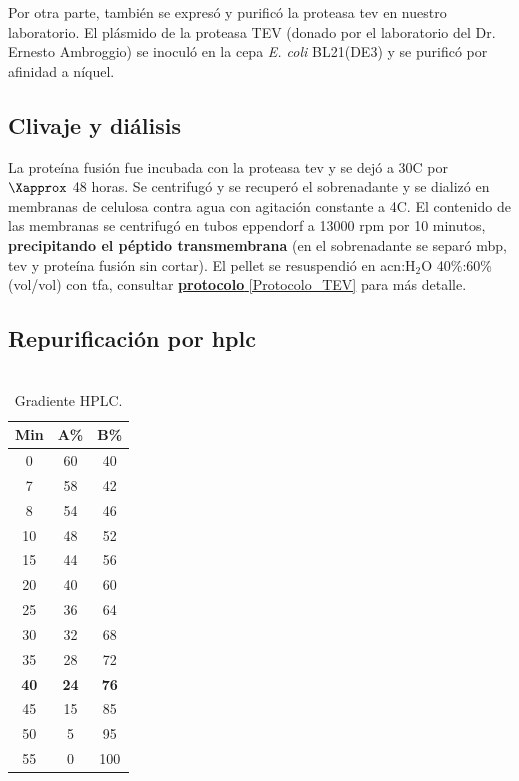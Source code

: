 Por otra parte, también se expresó y purificó la proteasa \ac{tev} en nuestro laboratorio. El plásmido de la proteasa TEV (donado por el laboratorio del Dr. Ernesto Ambroggio) se inoculó en la cepa \emph{E. coli} BL21(DE3) y se purificó por afinidad a níquel.

\subsection{Clivaje y diálisis}

La proteína fusión fue incubada con la proteasa \ac{tev} y se dejó a 30\textdegree C por $\Xapprox$ 48 horas. Se centrifugó y  se recuperó el sobrenadante y se dializó en membranas de celulosa contra agua con agitación constante a 4\textdegree C. El contenido de las membranas se centrifugó en tubos eppendorf a 13000 \ac{rpm} por 10 minutos, \textbf{precipitando el péptido transmembrana} (en el sobrenadante se separó \ac{mbp}, \ac{tev} y proteína fusión sin cortar). El pellet se resuspendió en \ac{acn}:H$_{2}$O 40\%:60\% (vol/vol) con \ac{tfa}, consultar \hyperref[Protocolo_TEV]{\textbf{protocolo} \ref*{Protocolo_TEV}} para más detalle.

\subsection{Repurificación por \ac{hplc}}

\begin{table}
\vspace{-0.63cm} %
\centering
    \caption{\\Gradiente HPLC.}\label{tab:hplc_gradiente}
    \begin{tabular}[t]{ccc}%
     \toprule  %
      {Min}  & {A\%} & {B\%}\\
      \hline
        0       &  60    & 40  \\
        7       &  58    & 42 \\
        8       &  54    & 46  \\
        10      &  48    & 52 \\
        15      &  44    & 56  \\
        20      &  40    & 60 \\
        25      &  36    & 64  \\
        30      &  32    & 68 \\
        35      &  28    & 72  \\
    \textbf{40} & \textbf{24}    & \textbf{76} \\
        45      &  15    & 85  \\
        50      &  5     & 95 \\
        55      &  0     & 100  \\
      \bottomrule %
    \end{tabular}
    \vspace{-6cm} %
    \end{table} 

